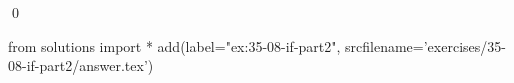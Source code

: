 
\begin{ex}
  \label{ex:35-08-if-part2}
  
  \qed
\end{ex}
\begin{python0}
from solutions import *
add(label="ex:35-08-if-part2",
    srcfilename='exercises/35-08-if-part2/answer.tex')
\end{python0}
